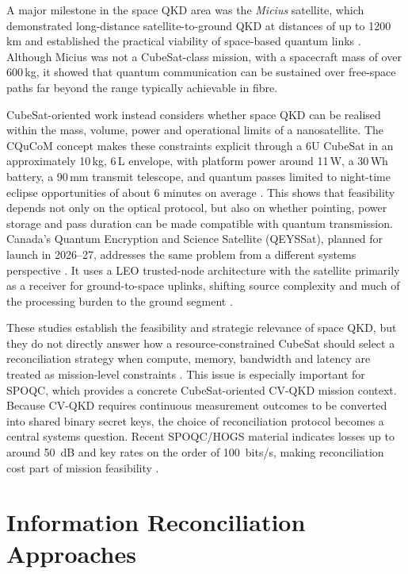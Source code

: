 \documentclass{UoYCSproject}
\begin{document}
A major milestone in the space QKD area was the \textit{Micius} satellite,
which demonstrated long-distance satellite-to-ground QKD at distances of up
to 1200\,km and established the practical viability of space-based quantum
links \cite{lauterbach_study_2023, lu_micius_2022}. Although Micius was not a
CubeSat-class mission, with a spacecraft mass of over 600\,kg, it showed that
quantum communication can be sustained over free-space paths far beyond the
range typically achievable in fibre.

CubeSat-oriented work instead considers whether space QKD can be realised
within the mass, volume, power and operational limits of a nanosatellite. The
CQuCoM concept makes these constraints explicit through a 6U CubeSat in an
approximately 10\,kg, 6\,L envelope, with platform power around 11\,W, a
30\,Wh battery, a 90\,mm transmit telescope, and quantum passes limited to
night-time eclipse opportunities of about 6 minutes on average
\cite{oi_cubesat_2017}. This shows that feasibility depends not only on the
optical protocol, but also on whether pointing, power storage and pass duration
can be made compatible with quantum transmission. Canada's Quantum Encryption
and Science Satellite (QEYSSat), planned for launch in 2026--27, addresses
the same problem from a different systems perspective \cite{agency_quantum_2017}.
It uses a LEO trusted-node architecture with the satellite primarily as a
receiver for ground-to-space uplinks, shifting source complexity and much of
the processing burden to the ground segment \cite{podmore_qkd_2021}.

These studies establish the feasibility and strategic relevance of space QKD,
but they do not directly answer how a resource-constrained CubeSat should
select a reconciliation strategy when compute, memory, bandwidth and latency
are treated as mission-level constraints \cite{jordan-parra_evaluation_2024}.
This issue is especially important for SPOQC, which provides a concrete
CubeSat-oriented CV-QKD mission context. Because CV-QKD requires continuous
measurement outcomes to be converted into shared binary secret keys, the
choice of reconciliation protocol becomes a central systems question. Recent 
SPOQC/HOGS material indicates losses up to around 50~dB and key rates on
the order of 100~bits/s, making reconciliation cost part of mission feasibility
\cite{noauthor_hubs_nodate, simmons_hogs_2025}.

\section{Information Reconciliation Approaches}
\label{sec:lit-reconciliation}
\end{document}

